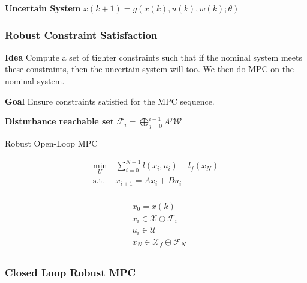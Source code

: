 
\textbf{Uncertain System}
$x(k+1) = g(x(k), u(k), w(k); \theta)$


\subsubsection{Robust Constraint Satisfaction}

\textbf{Idea}
Compute a set of tighter constraints such that if the nominal
system meets these constraints, then the uncertain system will too.
We then do MPC on the nominal system.

\textbf{Goal}
Ensure  constraints satisfied for the MPC sequence.

\textbf{Disturbance reachable set}
\quad
$\mathcal{F}_i = \bigoplus_{j=0}^{i-1} A^j \mathcal{W}$



\begin{sstTitleBox}{Robust Open-Loop MPC}
	\begin{sstOnlyFrame}
		\begin{minipage}[t]{0.55\linewidth}
			\[\begin{aligned}
					\min_U \      & \sum_{i=0}^{N-1} l(x_i, u_i) + l_f(x_N) \\
					\text{s.t.}\  & x_{i+1} = Ax_i + Bu_i                   \\
				\end{aligned}\]
		\end{minipage}
		\begin{minipage}[t]{0.4\linewidth}
			\[\begin{aligned}
					 & x_0 = x(k)                                  \\
					 & x_i \in \mathcal{X} \ominus \mathcal{F}_i   \\
					 & u_i \in \mathcal{U}                         \\
					 & x_N \in \mathcal{X}_f \ominus \mathcal{F}_N \\
				\end{aligned}\]
		\end{minipage}
	\end{sstOnlyFrame}
\end{sstTitleBox}

\subsubsection{Closed Loop Robust MPC}

